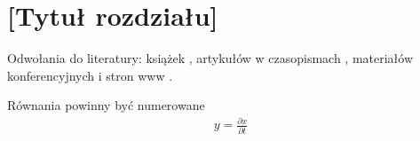 \chapter{[Tytuł rozdziału]}  %
% 


Odwołania do literatury:
książek \cite{bib:ksiazka},
artykułów w czasopismach \cite{bib:artykul},
materiałów konferencyjnych \cite{bib:konferencja}
i stron www \cite{bib:internet}.

Równania powinny być numerowane
\begin{align}
    y = \frac{\partial x}{\partial t}
\end{align}

%

%
%

